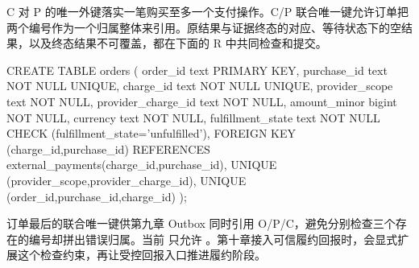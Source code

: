 C 对 P 的唯一外键落实一笔购买至多一个支付操作。C/P 联合唯一键允许订单把两个编号作为一个归属整体来引用。原结果与证据终态的对应、等待状态下的空结果，以及终态结果不可覆盖，都在下面的 R 中共同检查和提交。

\begin{BookCode}
CREATE TABLE orders (
  order_id text PRIMARY KEY,
  purchase_id text NOT NULL UNIQUE, charge_id text NOT NULL UNIQUE,
  provider_scope text NOT NULL, provider_charge_id text NOT NULL,
  amount_minor bigint NOT NULL, currency text NOT NULL,
  fulfillment_state text NOT NULL CHECK (fulfillment_state='unfulfilled'),
  FOREIGN KEY (charge_id,purchase_id)
    REFERENCES external_payments(charge_id,purchase_id),
  UNIQUE (provider_scope,provider_charge_id),
  UNIQUE (order_id,purchase_id,charge_id)
);
\end{BookCode}

订单最后的联合唯一键供第九章 Outbox 同时引用 O/P/C，避免分别检查三个存在的编号却拼出错误归属。当前  只允许 。第十章接入可信履约回报时，会显式扩展这个检查约束，再让受控回报入口推进履约阶段。
